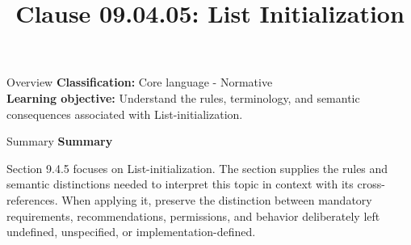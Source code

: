 \documentclass[10pt,letterpaper]{article}
\title{Clause 09.04.05: List Initialization}
\author{}
\date{}
\begin{document}
\maketitle
\begin{CornellOverviewBox}{Overview}
\textbf{Classification:} Core language - Normative\\[2pt]
\textbf{Learning objective:} Understand the rules, terminology, and semantic consequences associated with List-initialization.
\end{CornellOverviewBox}\begin{CornellSummaryBox}{Summary}
{\sffamily\bfseries\color{Accent} Summary}\par\vspace{3pt}Section 9.4.5 focuses on List-initialization. The section supplies the rules and semantic distinctions needed to interpret this topic in context with its cross-references. When applying it, preserve the distinction between mandatory requirements, recommendations, permissions, and behavior deliberately left undefined, unspecified, or implementation-defined.
\end{CornellSummaryBox}
\end{document}
